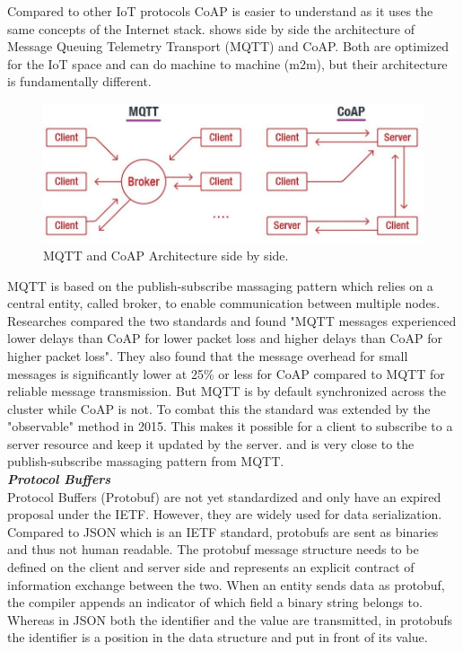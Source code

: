 Compared to other IoT protocols CoAP is easier to understand as it uses the same concepts of the Internet stack.  shows side by side the architecture of Message Queuing Telemetry Transport (MQTT) and CoAP. Both are optimized for the IoT space and can do machine to machine (m2m), but their architecture is fundamentally different.
\begin{figure}[h!]
    \centering
    \includegraphics[scale=0.45]{figures/mqtt-vs-coap.jpg}
    \caption{MQTT and CoAP Architecture side by side\cite{COAPvsMQTT27:online}.}
    \label{fig:mqttVsCoap}
\end{figure}
MQTT is based on the publish-subscribe massaging pattern which relies on a central entity, called broker, to enable communication between multiple nodes. Researches compared the two standards and found "MQTT messages experienced lower delays than CoAP for lower packet loss and higher delays than CoAP for higher packet loss"\cite{MQTTvsCoAPAnalysisIEEE}. They also found that the message overhead for small messages is significantly lower at 25\% or less for CoAP compared to MQTT for reliable message transmission. But MQTT is by default synchronized across the cluster while CoAP is not. To combat this the standard was extended by the "observable" method in 2015\cite{RFC7641observableCoAP}. This makes it possible for a client to subscribe to a server resource and keep it updated by the server. and is very close to the publish-subscribe massaging pattern from MQTT.\\[5mm]
{\textbf{\textit{Protocol Buffers}}}\\
Protocol Buffers (Protobuf) are not yet standardized and only have an expired proposal under the IETF\cite{rfernando-protocol-buffers-00}. However, they are widely used for data serialization. Compared to JSON which is an IETF standard, protobufs are sent as binaries and thus not human readable. The protobuf message structure needs to be defined on the client and server side and represents an explicit contract of information exchange between the two. When an entity sends data as protobuf, the compiler appends an indicator of which field a binary string belongs to. Whereas in JSON both the identifier and the value are transmitted, in protobufs the identifier is a position in the data structure and put in front of its value.
